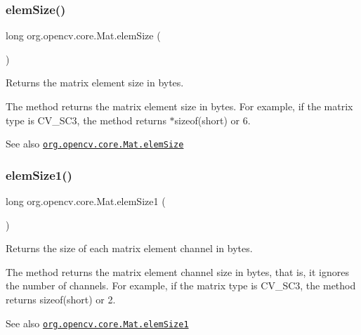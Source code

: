 \mbox{\label{classorg_1_1opencv_1_1core_1_1_mat_aefa109235b149088d48188cb54b891e9}} 
\subsubsection{\texorpdfstring{elem\+Size()}{elemSize()}}
{\footnotesize\ttfamily long org.\+opencv.\+core.\+Mat.\+elem\+Size (\begin{DoxyParamCaption}{ }\end{DoxyParamCaption})}

Returns the matrix element size in bytes.

The method returns the matrix element size in bytes. For example, if the matrix type is {\ttfamily C\+V\+\_\+S\+C3}, the method returns {$\ast$sizeof(short)} or 6.

\begin{DoxySeeAlso}{See also}
\href{http://docs.opencv.org/modules/core/doc/basic_structures.html#mat-elemsize}{\tt org.\+opencv.\+core.\+Mat.\+elem\+Size} 
\end{DoxySeeAlso}
\mbox{\label{classorg_1_1opencv_1_1core_1_1_mat_ae174b003b4f0e87a3a1dbf805962b145}} 
\subsubsection{\texorpdfstring{elem\+Size1()}{elemSize1()}}
{\footnotesize\ttfamily long org.\+opencv.\+core.\+Mat.\+elem\+Size1 (\begin{DoxyParamCaption}{ }\end{DoxyParamCaption})}

Returns the size of each matrix element channel in bytes.

The method returns the matrix element channel size in bytes, that is, it ignores the number of channels. For example, if the matrix type is {\ttfamily C\+V\+\_\+S\+C3}, the method returns {\ttfamily sizeof(short)} or 2.

\begin{DoxySeeAlso}{See also}
\href{http://docs.opencv.org/modules/core/doc/basic_structures.html#mat-elemsize1}{\tt org.\+opencv.\+core.\+Mat.\+elem\+Size1} 
\end{DoxySeeAlso}
\mbox{\label{classorg_1_1opencv_1_1core_1_1_mat_a873fa8cc0d87ffae2b9c9ed94d79ddec}} 
